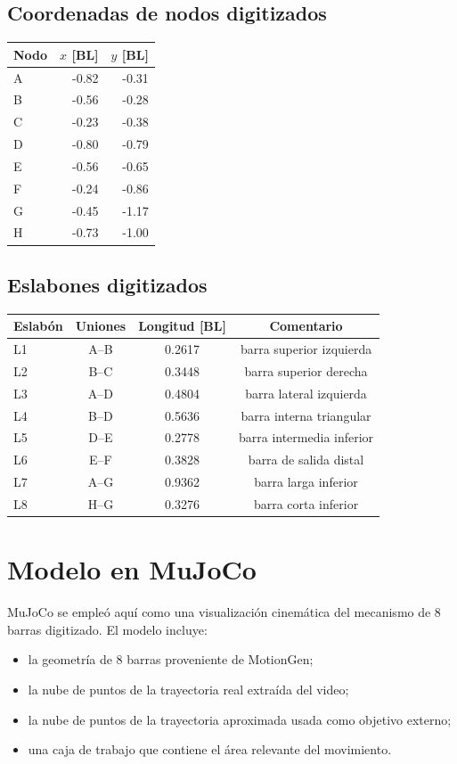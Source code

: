 \documentclass[11pt]{article}
\begin{document}
\subsection*{Coordenadas de nodos digitizados}
\begin{center}
\begin{tabular}{lrr}
\toprule
Nodo & \(x\) [BL] & \(y\) [BL] \\
\midrule
A & -0.82 & -0.31 \\
B & -0.56 & -0.28 \\
C & -0.23 & -0.38 \\
D & -0.80 & -0.79 \\
E & -0.56 & -0.65 \\
F & -0.24 & -0.86 \\
G & -0.45 & -1.17 \\
H & -0.73 & -1.00 \\
\bottomrule
\end{tabular}
\end{center}

\subsection*{Eslabones digitizados}
\begin{center}
\small
\begin{tabular}{lccc}
\toprule
Eslabón & Uniones & Longitud [BL] & Comentario \\
\midrule
L1 & A--B & 0.2617 & barra superior izquierda \\
L2 & B--C & 0.3448 & barra superior derecha \\
L3 & A--D & 0.4804 & barra lateral izquierda \\
L4 & B--D & 0.5636 & barra interna triangular \\
L5 & D--E & 0.2778 & barra intermedia inferior \\
L6 & E--F & 0.3828 & barra de salida distal \\
L7 & A--G & 0.9362 & barra larga inferior \\
L8 & H--G & 0.3276 & barra corta inferior \\
\bottomrule
\end{tabular}
\end{center}

\section*{Modelo en MuJoCo}
MuJoCo se empleó aquí como una visualización cinemática del mecanismo de 8 barras digitizado. El modelo incluye:
\begin{itemize}[leftmargin=1.6em]
\item la geometría de 8 barras proveniente de MotionGen;
\item la nube de puntos de la trayectoria real extraída del video;
\item la nube de puntos de la trayectoria aproximada usada como objetivo externo;
\item una caja de trabajo que contiene el área relevante del movimiento.
\end{itemize}
\end{document}
